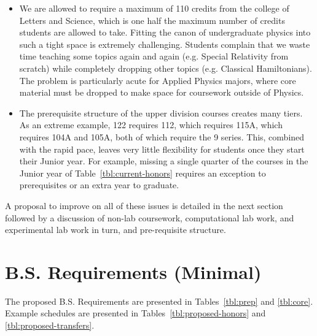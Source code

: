 \documentclass[12pt]{article}
\begin{document}
\begin{itemize}
\item We are allowed to require a maximum of 110 credits from the college of Letters and Science, which is one half the maximum number of credits students are allowed to take.  Fitting the canon of undergraduate physics into such a tight space is extremely challenging.  Students complain that we waste time teaching some topics again and again (e.g. Special Relativity from scratch) while completely dropping other topics (e.g. Classical Hamiltonians).  The problem is particularly acute for Applied Physics majors, where core material must be dropped to make space for coursework outside of Physics.

\item The prerequisite structure of the upper division courses creates many tiers.  
As an extreme example, 122 requires 112, which requires 115A, which requires 104A and 105A, both of which require the 9 series.  This, combined with the rapid pace, leaves very little flexibility for students once they start their Junior year.  For example, missing a single quarter of the courses in the Junior year of Table~\ref{tbl:current-honors} requires an exception to prerequisites or an extra year to graduate.

\label{tbl:current-honors}

\end{itemize}

A proposal to improve on all of these issues is detailed in the next section followed by a discussion of non-lab coursework, computational lab work, and experimental lab work in turn, and pre-requisite structure.
\newpage

\section{B.S. Requirements (Minimal)}

The proposed B.S. Requirements are presented in Tables~\ref{tbl:prep} and \ref{tbl:core}.  Example schedules are presented in Tables~\ref{tbl:proposed-honors} and \ref{tbl:proposed-transfers}.
\end{document}
